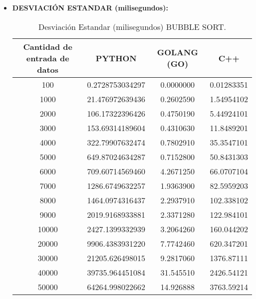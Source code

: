 \documentclass{article}
\begin{document}
\begin{itemize}
      \item \textbf{DESVIACIÓN ESTANDAR (milisegundos):}
        \begin{table}[H]
            \centering
            \begin{tabular}{||c c c c||} 
              \hline
              \textbf{Cantidad de entrada de datos} & \textbf{PYTHON} & \textbf{GOLANG (GO)} & \textbf{C++} \\ [0.5ex] 
              \hline\hline
              100    &  0.2728753034297  &  0.0000000  &  0.01283351  \\ [0.5ex]
              1000   &  21.476972639436  &  0.2602590  &  1.54954102  \\ [0.5ex]
              2000   &  106.17322396426  &  0.4750190  &  5.44924101  \\ [0.5ex]
              3000   &  153.69314189604  &  0.4310630  &  11.8489201  \\ [0.5ex]
              4000   &  322.79907632474  &  0.7802910  &  35.3547101  \\ [0.5ex]
              5000   &  649.87024634287  &  0.7152800  &  50.8431303  \\ [0.5ex]
              6000   &  709.60714569460  &  4.2671250  &  66.0707104  \\ [0.5ex]
              7000   &  1286.6749632257  &  1.9363900  &  82.5959203  \\ [0.5ex]
              8000   &  1464.0974316437  &  2.2937910  &  102.338102  \\ [0.5ex]
              9000   &  2019.9168933881  &  2.3371280  &  122.984101  \\ [0.5ex]
              10000  &  2427.1399332939  &  3.2064260  &  160.044202  \\ [0.5ex]
              20000  &  9906.4383931220  &  7.7742460  &  620.347201  \\ [0.5ex]
              30000  &  21205.626498015  &  9.2817060  &  1376.87111  \\ [0.5ex]
              40000  &  39735.964451084  &  31.545510  &  2426.54121  \\ [0.5ex]
              50000  &  64264.998022662  &  14.926888  &  3763.59214  \\ [0.5ex]
              \hline
            \end{tabular}
            \caption{Desviación Estandar (milisegundos) BUBBLE SORT.}
            \label{table:desviacionEstandarBubbleSort}
        \end{table}
    \end{itemize}
\end{document}
